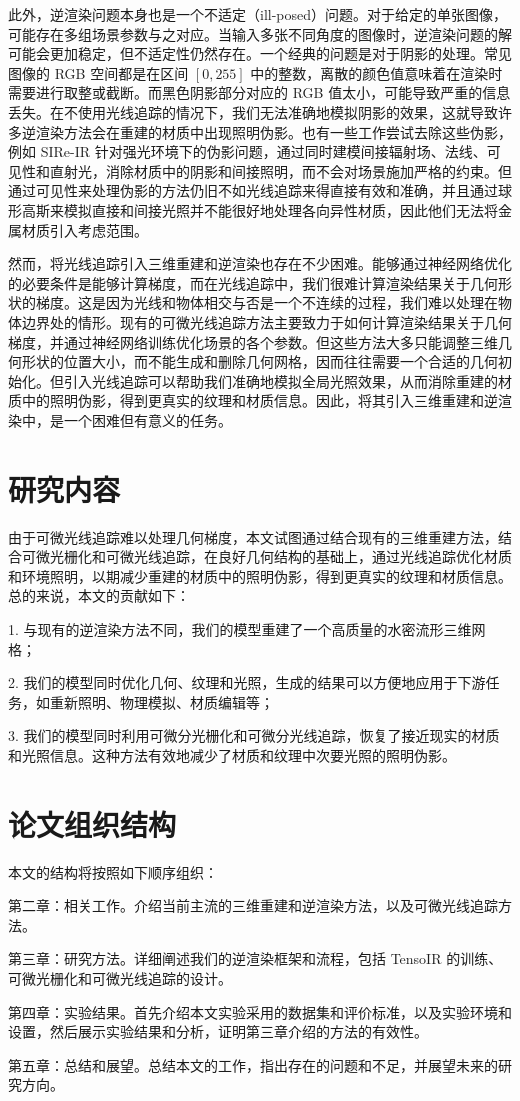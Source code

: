 此外，逆渲染问题本身也是一个不适定（ill-posed）问题。对于给定的单张图像，可能存在多组场景参数与之对应。当输入多张不同角度的图像时，逆渲染问题的解可能会更加稳定，但不适定性仍然存在。一个经典的问题是对于阴影的处理。常见图像的 RGB 空间都是在区间 $[0, 255]$ 中的整数，离散的颜色值意味着在渲染时需要进行取整或截断。而黑色阴影部分对应的 RGB 值太小，可能导致严重的信息丢失。在不使用光线追踪的情况下，我们无法准确地模拟阴影的效果，这就导致许多逆渲染方法会在重建的材质中出现照明伪影。也有一些工作尝试去除这些伪影，例如 SIRe-IR \cite{SIRe-IR} 针对强光环境下的伪影问题，通过同时建模间接辐射场、法线、可见性和直射光，消除材质中的阴影和间接照明，而不会对场景施加严格的约束。但通过可见性来处理伪影的方法仍旧不如光线追踪来得直接有效和准确，并且通过球形高斯来模拟直接和间接光照并不能很好地处理各向异性材质，因此他们无法将金属材质引入考虑范围。

然而，将光线追踪引入三维重建和逆渲染也存在不少困难。能够通过神经网络优化的必要条件是能够计算梯度，而在光线追踪中，我们很难计算渲染结果关于几何形状的梯度。这是因为光线和物体相交与否是一个不连续的过程，我们难以处理在物体边界处的情形。现有的可微光线追踪方法主要致力于如何计算渲染结果关于几何梯度，并通过神经网络训练优化场景的各个参数。但这些方法大多只能调整三维几何形状的位置大小，而不能生成和删除几何网格，因而往往需要一个合适的几何初始化。但引入光线追踪可以帮助我们准确地模拟全局光照效果，从而消除重建的材质中的照明伪影，得到更真实的纹理和材质信息。因此，将其引入三维重建和逆渲染中，是一个困难但有意义的任务。

\section{研究内容}

由于可微光线追踪难以处理几何梯度，本文试图通过结合现有的三维重建方法，结合可微光栅化和可微光线追踪，在良好几何结构的基础上，通过光线追踪优化材质和环境照明，以期减少重建的材质中的照明伪影，得到更真实的纹理和材质信息。总的来说，本文的贡献如下：

1. 与现有的逆渲染方法不同，我们的模型重建了一个高质量的水密流形三维网格；

2. 我们的模型同时优化几何、纹理和光照，生成的结果可以方便地应用于下游任务，如重新照明、物理模拟、材质编辑等；

3. 我们的模型同时利用可微分光栅化和可微分光线追踪，恢复了接近现实的材质和光照信息。这种方法有效地减少了材质和纹理中次要光照的照明伪影。

\section{论文组织结构}

本文的结构将按照如下顺序组织：

第二章：相关工作。介绍当前主流的三维重建和逆渲染方法，以及可微光线追踪方法。

第三章：研究方法。详细阐述我们的逆渲染框架和流程，包括 TensoIR 的训练、可微光栅化和可微光线追踪的设计。

第四章：实验结果。首先介绍本文实验采用的数据集和评价标准，以及实验环境和设置，然后展示实验结果和分析，证明第三章介绍的方法的有效性。

第五章：总结和展望。总结本文的工作，指出存在的问题和不足，并展望未来的研究方向。
